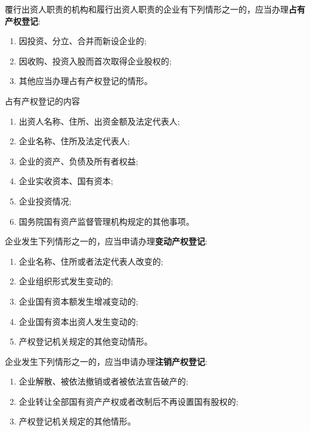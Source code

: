 \documentclass[UTF8,12pt]{ctexart}
\numberwithin{equation}{section} %
\numberwithin{figure}{section}
\numberwithin{table}{section}
\begin{document}
	
	覆行出资人职责的机构和履行出资人职责的企业有下列情形之一的，应当办理\textbf{占有产权登记}:
	\begin{enumerate}
		\item 因投资、分立、合并而新设企业的;
		
		\item 因收购、投资入股而首次取得企业股权的;
		
		\item 其他应当办理占有产权登记的情形。
	\end{enumerate}
	
	占有产权登记的内容
	\begin{enumerate}
		\item 出资人名称、住所、出资金额及法定代表人;
		
		\item 企业名称、住所及法定代表人;
		
		\item 企业的资产、负债及所有者权益;
		
		\item 企业实收资本、国有资本;
		
		\item 企业投资情况;
		
		\item 国务院国有资产监督管理机构规定的其他事项。
	\end{enumerate}

	
	
	企业发生下列情形之一的，应当申请办理\textbf{变动产权登记}:
	\begin{enumerate}
		\item 企业名称、住所或者法定代表人改变的;
		
		\item 企业组织形式发生变动的;
		
		\item 企业国有资本额发生增减变动的;
		
		\item 企业国有资本出资人发生变动的;
		
		\item 产权登记机关规定的其他变动情形。
	\end{enumerate}
	
	企业发生下列情形之一的，应当申请办理\textbf{注销产权登记}:
	\begin{enumerate}
		\item 企业解散、被依法撤销或者被依法宣告破产的;
		
		\item 企业转让全部国有资产产权或者改制后不再设置国有股权的;
		
		\item 产权登记机关规定的其他情形。
	\end{enumerate}
	
\end{document}
